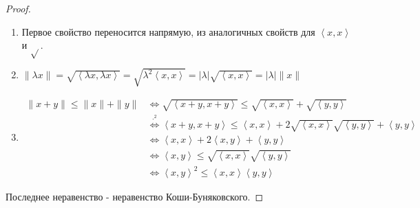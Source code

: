 \begin{properties}
\begin{enumerate}
\begin{proof}
                \begin{enumerate}
                    \item Первое свойство переносится напрямую, из аналогичных свойств для $\left<x, x\right>$ и $\sqrt{} $.
                    \item $\|\lambda x\| = \sqrt{\left<\lambda x, \lambda x\right>} = \sqrt{\lambda^2 \left<x, x\right>} = |\lambda| \sqrt{\left<x, x\right>} = |\lambda| \|x\|$ 
                    \item
                        \begin{equation*}
                            \begin{split}
                                \|x + y\| \le \|x\| + \|y\|
                                &\iff \sqrt{\left<x + y, x+y\right>} \le \sqrt{\left<x, x\right>} + \sqrt{\left<y, y\right>}\\
                                &\overset{\cdot^2}{\iff} \left<x + y, x + y\right>  \le \left<x, x\right> + 2 \sqrt{\left<x, x\right>} \sqrt{\left<y, y\right>} + \left<y, y\right>\\
                                &\iff \left<x, x\right> + 2\left<x, y\right> + \left<y, y\right>\\
                                &\iff \left<x, y\right> \le \sqrt{\left<x, x\right>}\sqrt{\left<y, y\right>}\\
                                &\iff \left<x, y\right>^2 \le \left<x, x\right>\left<y, y\right>
                            \end{split}
                        \end{equation*}
                \end{enumerate}
                Последнее неравенство - неравенство Коши-Буняковского.
            \end{proof}
    \end{enumerate}
\end{properties}
